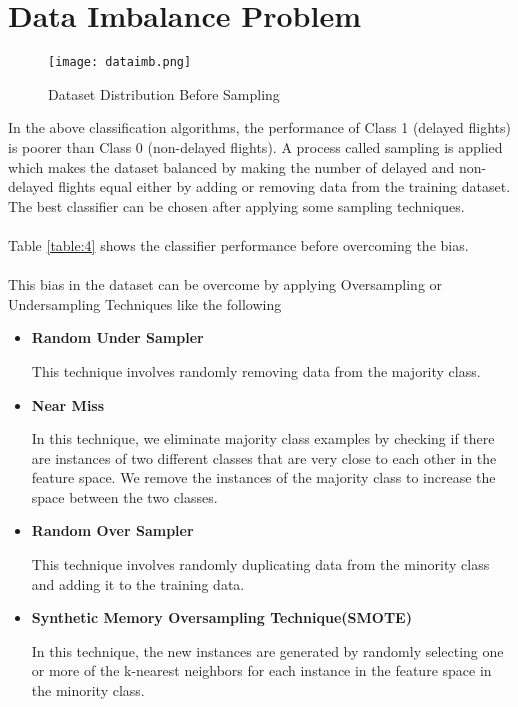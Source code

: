 \documentclass[12pt,letter-paper]{article}
\begin{document}
    
\section{Data Imbalance Problem}        

    \begin{figure}[H]%
        \begin{center}
          \texttt{[image: dataimb.png]}%
            \caption{Dataset Distribution Before Sampling} 
            \label{fig:1}
        \end{center}
    \end{figure}
    
    In the above classification algorithms, the performance of Class 1 (delayed flights) is poorer than Class 0 (non-delayed flights). A process called sampling is applied which makes the dataset balanced by making the number of delayed and non-delayed flights equal either by adding or removing data from the training dataset. The best classifier can be chosen after applying some sampling techniques.
    
    \paragraph{}
    Table \ref{table:4} shows the classifier performance before overcoming the bias.
    
    \paragraph{}
        This bias in the dataset can be overcome by applying Oversampling or Undersampling Techniques like the following
        \begin{itemize}
        \item\textbf{Random Under Sampler}
            
            This technique involves randomly removing data from the majority class.
            
        \item\textbf{Near Miss}
            
            In this technique, we eliminate majority class examples by checking if there are instances of two different classes that are very close to each other in the feature space. We remove the instances of the majority class to increase the space between the two classes.  
            
        \item\textbf{Random Over Sampler}
            
            This technique involves randomly duplicating data from the minority class and adding it to the training data.
        
        \item\textbf{Synthetic Memory Oversampling Technique(SMOTE)}
            
            In this technique, the new instances are generated by randomly selecting one or more of the k-nearest neighbors for each instance in the feature space in the minority class.
        \end{itemize}
        
\end{document}
